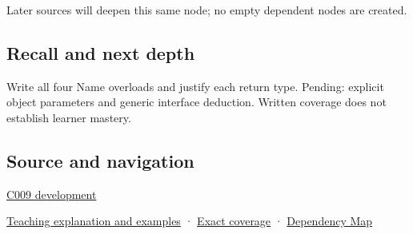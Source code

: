 Later sources will deepen this same node; no empty dependent nodes are created.

\subsection{Recall and next depth}\label{appendix-d42039b1d6f7-recall-and-next-depth}

Write all four Name overloads and justify each return type. Pending: explicit object parameters and generic interface deduction. Written coverage does not establish learner mastery.

\subsection{Source and navigation}\label{appendix-d42039b1d6f7-source-and-navigation}

\hyperref[appendix-fd090d982a15-m009---parts-127-147]{C009 development}

\hyperref[01-foundations-i-ch003-an-accessor-must-respect-the-callers-lifetime]{Teaching explanation and examples} · \hyperref[appendix-fd090d982a15-m008---parts-113-126]{Exact coverage} · \hyperref[appendix-4ad47bdd269a]{Dependency Map}
